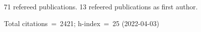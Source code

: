 71 refereed publications. 13 refeered publications as first author.

Total citations~=~2421; h-index~=~25 (2022-04-03)